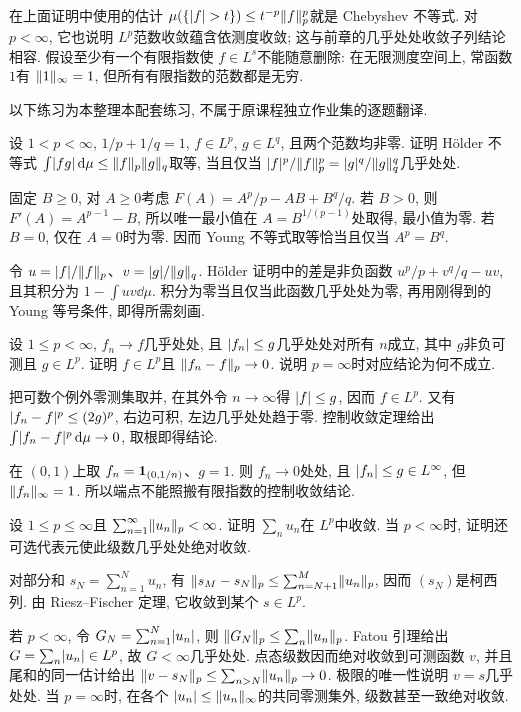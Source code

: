 在上面证明中使用的估计 $\mu(\{\lvert f\rvert>t\})\le t^{-p}\lVert f\rVert_p^p$就是 Chebyshev 不等式. 对 $p<\infty$, 它也说明 $L^p$范数收敛蕴含依测度收敛; 这与前章的几乎处处收敛子列结论相容. 假设至少有一个有限指数使 $f\in L^s$不能随意删除: 在无限测度空间上, 常函数 $1$有 $\lVert 1\rVert_\infty=1$, 但所有有限指数的范数都是无穷.


以下练习为本整理本配套练习, 不属于原课程独立作业集的逐题翻译.

\begin{exercise}\label{ra:c5:ex-holder-equality}
设 $1<p<\infty$, $1/p+1/q=1$, $f\in L^p$, $g\in L^q$, 且两个范数均非零. 证明 Hölder 不等式 $\int\lvert fg\rvert\,\mathrm d\mu\le\lVert f\rVert_p\lVert g\rVert_q$取等, 当且仅当 $\lvert f\rvert^p/\lVert f\rVert_p^p=\lvert g\rvert^q/\lVert g\rVert_q^q$几乎处处.
\end{exercise}
\begin{solution}
固定 $B\ge0$, 对 $A\ge0$考虑 $F(A)=A^p/p-AB+B^q/q$. 若 $B>0$, 则 $F'(A)=A^{p-1}-B$, 所以唯一最小值在 $A=B^{1/(p-1)}$处取得, 最小值为零. 若 $B=0$, 仅在 $A=0$时为零. 因而 Young 不等式取等恰当且仅当 $A^p=B^q$.

令 $u=\lvert f\rvert/\lVert f\rVert_p$、$v=\lvert g\rvert/\lVert g\rVert_q$. Hölder 证明中的差是非负函数 $u^p/p+v^q/q-uv$, 且其积分为 $1-\int uv\dd\mu$. 积分为零当且仅当此函数几乎处处为零, 再用刚得到的 Young 等号条件, 即得所需刻画.
\end{solution}

\begin{exercise}\label{ra:c5:ex-dominated-lp}
设 $1\le p<\infty$, $f_n\to f$几乎处处, 且 $\lvert f_n\rvert\le g$几乎处处对所有 $n$成立, 其中 $g$非负可测且 $g\in L^p$. 证明 $f\in L^p$且 $\lVert f_n-f\rVert_p\to0$. 说明 $p=\infty$时对应结论为何不成立.
\end{exercise}
\begin{solution}
把可数个例外零测集取并, 在其外令 $n\to\infty$得 $\lvert f\rvert\le g$, 因而 $f\in L^p$. 又有 $\lvert f_n-f\rvert^p\le(2g)^p$, 右边可积, 左边几乎处处趋于零. 控制收敛定理给出 $\int\lvert f_n-f\rvert^p\,\mathrm d\mu\to0$, 取根即得结论.

在 $(0,1)$上取 $f_n=\mathbf 1_{(0,1/n)}$、$g=1$. 则 $f_n\to0$处处, 且 $\lvert f_n\rvert\le g\in L^\infty$, 但 $\lVert f_n\rVert_\infty=1$. 所以端点不能照搬有限指数的控制收敛结论.
\end{solution}

\begin{exercise}\label{ra:c5:ex-series}
设 $1\le p\le\infty$且 $\sum_{n=1}^\infty\lVert u_n\rVert_p<\infty$. 证明 $\sum_nu_n$在 $L^p$中收敛. 当 $p<\infty$时, 证明还可选代表元使此级数几乎处处绝对收敛.
\end{exercise}
\begin{solution}
对部分和 $s_N=\sum_{n=1}^Nu_n$, 有 $\lVert s_M-s_N\rVert_p\le\sum_{n=N+1}^M\lVert u_n\rVert_p$, 因而 $(s_N)$是柯西列. 由 Riesz--Fischer 定理, 它收敛到某个 $s\in L^p$.

若 $p<\infty$, 令 $G_N=\sum_{n=1}^N\lvert u_n\rvert$, 则 $\lVert G_N\rVert_p\le\sum_n\lVert u_n\rVert_p$. Fatou 引理给出 $G=\sum_n\lvert u_n\rvert\in L^p$, 故 $G<\infty$几乎处处. 点态级数因而绝对收敛到可测函数 $v$, 并且尾和的同一估计给出 $\lVert v-s_N\rVert_p\le\sum_{n>N}\lVert u_n\rVert_p\to0$. 极限的唯一性说明 $v=s$几乎处处. 当 $p=\infty$时, 在各个 $\lvert u_n\rvert\le\lVert u_n\rVert_\infty$的共同零测集外, 级数甚至一致绝对收敛.
\end{solution}

